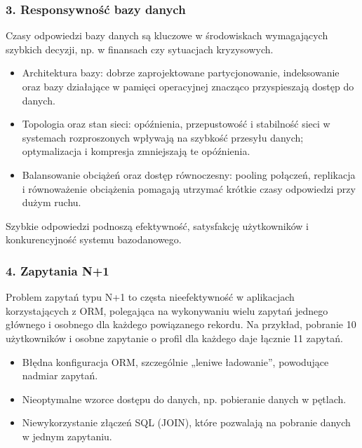 \documentclass[a4paper,11pt,openany,english]{sphinxmanual}
\begin{document}
\subsubsection{3. Responsywność bazy danych}
\label{\detokenize{rozdzial2/Wydajnosc-Skalowanie-i-Replikacja/index:responsywnosc-bazy-danych}}
\sphinxAtStartPar
Czasy odpowiedzi bazy danych są kluczowe w środowiskach wymagających szybkich decyzji, np. w finansach czy sytuacjach kryzysowych.
\begin{description}
\begin{itemize}
\item {} 
\sphinxAtStartPar
Architektura bazy: dobrze zaprojektowane partycjonowanie, indeksowanie oraz bazy działające w pamięci operacyjnej znacząco przyspieszają dostęp do danych.

\item {} 
\sphinxAtStartPar
Topologia oraz stan sieci: opóźnienia, przepustowość i stabilność sieci w systemach rozproszonych wpływają na szybkość przesyłu danych; optymalizacja i kompresja zmniejszają te opóźnienia.

\item {} 
\sphinxAtStartPar
Balansowanie obciążeń oraz dostęp równoczesny: pooling połączeń, replikacja i równoważenie obciążenia pomagają utrzymać krótkie czasy odpowiedzi przy dużym ruchu.

\end{itemize}

\end{description}

\sphinxAtStartPar
Szybkie odpowiedzi podnoszą efektywność, satysfakcję użytkowników i konkurencyjność systemu bazodanowego.


\subsubsection{4. Zapytania N+1}
\label{\detokenize{rozdzial2/Wydajnosc-Skalowanie-i-Replikacja/index:zapytania-n-1}}
\sphinxAtStartPar
Problem zapytań typu N+1 to częsta nieefektywność w aplikacjach korzystających z ORM, polegająca na wykonywaniu wielu zapytań \textendash{} jednego głównego i osobnego dla każdego powiązanego rekordu. Na przykład, pobranie 10 użytkowników i osobne zapytanie o profil dla każdego daje łącznie 11 zapytań.
\begin{description}
\begin{itemize}
\item {} 
\sphinxAtStartPar
Błędna konfiguracja ORM, szczególnie „leniwe ładowanie”, powodujące nadmiar zapytań.

\item {} 
\sphinxAtStartPar
Nieoptymalne wzorce dostępu do danych, np. pobieranie danych w pętlach.

\item {} 
\sphinxAtStartPar
Niewykorzystanie złączeń SQL (JOIN), które pozwalają na pobranie danych w jednym zapytaniu.

\end{itemize}

\end{description}
\end{document}
